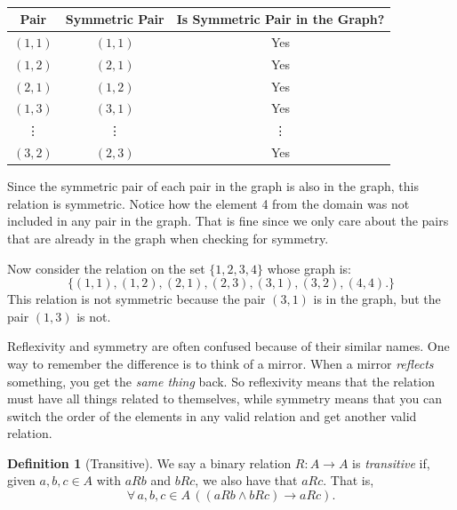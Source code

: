 \documentclass[11pt,oneside]{book}
\theoremstyle{definition}
\newtheorem{defn}[thm]{Definition}
\begin{document}
\begin{table}[H]
\centering
\begin{tabular}{c|c|c}
    Pair & Symmetric Pair & Is Symmetric Pair in the Graph? \\
    \hline
    $(1, 1)$ & $(1, 1)$ & Yes \\
    $(1, 2)$ & $(2, 1)$ & Yes \\
    $(2, 1)$ & $(1, 2)$ & Yes \\
    $(1, 3)$ & $(3, 1)$ & Yes \\
    \vdots & \vdots & \vdots \\
    $(3, 2)$ & $(2, 3)$ & Yes
\end{tabular}
\caption{} \label{tab:Symmetry}
\end{table}
Since the symmetric pair of each pair in the graph is also in the graph, this relation is symmetric.
Notice how the element 4 from the domain was not included in any pair in the graph.
That is fine since we only care about the pairs that are already in the graph when checking for symmetry.

Now consider the relation on the set $\{ 1, 2, 3, 4 \}$ whose graph is:
\[ \{ (1, 1), (1, 2), (2, 1), (2, 3), (3, 1), (3, 2), (4, 4). \} \]
This relation is not symmetric because the pair $(3, 1)$ is in the graph, but the pair $(1, 3)$ is not.

Reflexivity and symmetry are often confused because of their similar names.
One way to remember the difference is to think of a mirror.
When a mirror \emph{reflects} something, you get the \emph{same thing} back.
So reflexivity means that the relation must have all things related to themselves, while symmetry means that you can switch the order of the elements in any valid relation and get another valid relation.

\begin{defn}[Transitive]
    We say a binary relation $R: A \to A$ is \emph{transitive} if, given $a, b, c \in A$ with $a R b$ and $b R c$, we also have that $a R c$.
    That is,
    \[ \forall\, a, b, c \in A\, ((a R b \land b R c) \rightarrow a R c). \]
\end{defn}
\end{document}
